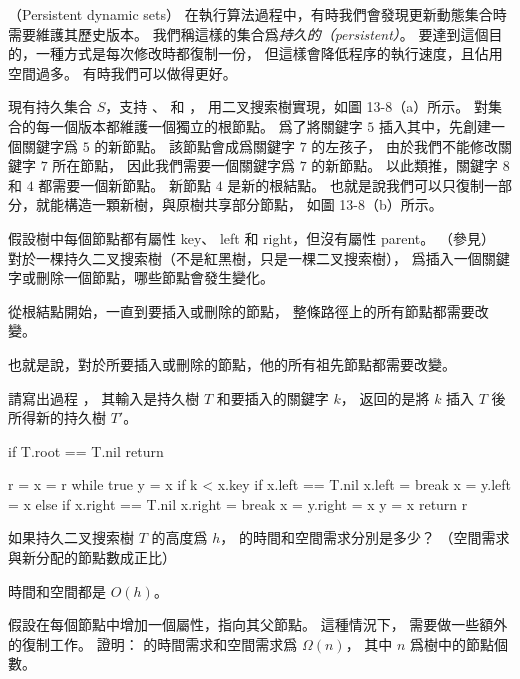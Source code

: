 \startPROBLEM
（Persistent dynamic sets）
在執行算法過程中，有時我們會發現更新動態集合時需要維護其歷史版本。
我們稱這樣的集合爲\emph{持久的（persistent）}。
要達到這個目的，一種方式是每次修改時都復制一份，
但這樣會降低程序的執行速度，且佔用空間過多。
有時我們可以做得更好。

現有持久集合 $S$，支持 、  和 ，
用二叉搜索樹實現，如圖 13-8（a）所示。
對集合的每一個版本都維護一個獨立的根節點。
爲了將關鍵字 $5$ 插入其中，先創建一個關鍵字爲 $5$ 的新節點。
該節點會成爲關鍵字 $7$ 的左孩子，
由於我們不能修改關鍵字 $7$ 所在節點，
因此我們需要一個關鍵字爲 $7$ 的新節點。
以此類推，關鍵字 $8$ 和 $4$ 都需要一個新節點。
新節點 $4$ 是新的根結點。
也就是說我們可以只復制一部分，就能構造一顆新樹，與原樹共享部分節點，
如圖 13-8（b）所示。

假設樹中每個節點都有屬性 key、 left 和 right，但沒有屬性 parent。
（參見\inexercise[13.3-6]）
\startigBase[a]\startitem%
對於一棵持久二叉搜索樹（不是紅黑樹，只是一棵二叉搜索樹），
爲插入一個關鍵字或刪除一個節點，哪些節點會發生變化。
\stopitem\stopigBase

\startANSWER
從根結點開始，一直到要插入或刪除的節點，
整條路徑上的所有節點都需要改變。

也就是說，對於所要插入或刪除的節點，他的所有祖先節點都需要改變。
\stopANSWER

\startigBase[continue]\startitem%
請寫出過程 ，
其輸入是持久樹 $T$ 和要插入的關鍵字 $k$，
返回的是將 $k$ 插入 $T$ 後所得新的持久樹 $T'$。
\stopitem\stopigBase

\startANSWER
{}
\startCLRSCODE
if T.root == T.nil
	return 

r = 
x = r
while true
	y = x
	if k < x.key
		if x.left == T.nil
			x.left = 
			break
		x = 
		y.left = x
	else
		if x.right == T.nil
			x.right = 
			break
		x = 
		y.right = x
	y = x
return r
\stopCLRSCODE
\stopANSWER

\startigBase[continue]\startitem%
如果持久二叉搜索樹 $T$ 的高度爲 $h$，
  的時間和空間需求分別是多少？
（空間需求與新分配的節點數成正比）
\stopitem\stopigBase

\startANSWER
時間和空間都是 $O(h)$。
\stopANSWER

\startigBase[continue]\startitem%
假設在每個節點中增加一個屬性，指向其父節點。
這種情況下，  需要做一些額外的復制工作。
證明：  的時間需求和空間需求爲 $\Omega(n)$，
其中 $n$ 爲樹中的節點個數。
\stopitem\stopigBase

